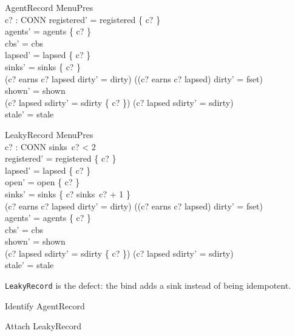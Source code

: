 \documentclass[a4paper,10pt,fleqn]{article}
\begin{document}
\begin{schema}{AgentRecord}
  \Delta MenuPres \\
  c? : CONN
\where
  registered' = registered \cup \{ c? \} \\
  agents' = agents \cup \{ c? \} \\
  cbs' = cbs \\
  lapsed' = lapsed \setminus \{ c? \} \\
  sinks' = sinks \oplus \{ c?  \} \\
  (c? \in earns \land c? \notin lapsed \land dirty' = dirty) \lor
    ((c? \notin earns \lor c? \in lapsed) \land dirty' = fset) \\
  shown' = shown \\
  (c? \in lapsed \land sdirty' = sdirty \cup \{ c? \}) \lor
    (c? \notin lapsed \land sdirty' = sdirty) \\
  stale' = stale
\end{schema}

\begin{schema}{LeakyRecord}
  \Delta MenuPres \\
  c? : CONN
\where
  sinks~c? < 2 \\
  registered' = registered \cup \{ c? \} \\
  lapsed' = lapsed \setminus \{ c? \} \\
  open' = open \cup \{ c? \} \\
  sinks' = sinks \oplus \{ c? \mapsto sinks~c? + 1 \} \\
  (c? \in earns \land c? \notin lapsed \land dirty' = dirty) \lor
    ((c? \notin earns \lor c? \in lapsed) \land dirty' = fset) \\
  agents' = agents \cup \{ c? \} \\
  cbs' = cbs \\
  shown' = shown \\
  (c? \in lapsed \land sdirty' = sdirty \cup \{ c? \}) \lor
    (c? \notin lapsed \land sdirty' = sdirty) \\
  stale' = stale
\end{schema}

\texttt{LeakyRecord} is the defect: the bind adds a sink instead of being idempotent.

\begin{zed}
  Identify  AgentRecord \land [\Delta MenuPres | open' = open]
\end{zed}

\begin{zed}
  Attach  LeakyRecord
\end{zed}
\end{document}
